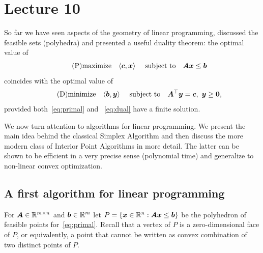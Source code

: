%
%
% 


\chapter*{Lecture 10}
\addtocounter{chapter}{10}
\addtocounter{section}{0}


So far we have seen aspects of the geometry of linear programming, discussed the feasible sets (polyhedra) and presented a useful duality theorem:
the optimal value of
\begin{equation}\label{eq:primal}\tag{P}
 \text{maximize}\quad \langle {\bm{c}}, {\bm{x}} \rangle \ \quad\text{subject to}\quad \bm{A}\bm{x}\leq \bm{b}
\end{equation}
coincides with the optimal value of
\begin{equation}\label{eq:dual}\tag{D}
 \text{minimize}\quad \langle {\bm{b}}, {\bm{y}} \rangle \ \quad\text{subject to}\quad \bm{A}^{\top}\bm{y}=\bm{c}, \  \bm{y}\geq \bm{0},
\end{equation}
provided both~\eqref{eq:primal} and ~\eqref{eq:dual} have a finite solution. 

We now turn attention to algorithms for linear programming. We present the main idea behind the classical Simplex Algorithm and then discuss the more modern class of Interior Point Algorithms in more detail. The latter can be shown to be efficient in a very precise sense (polynomial time) and generalize to non-linear convex optimization.

\section{A first algorithm for linear programming}
For $\bm{A}\in \mathbb{R}^{m\times n}$ and $\bm{b}\in \mathbb{R}^m$ let $P=\{\bm{x}\in \mathbb{R}^n\mathrel{\mathop{:}} \bm{A}\bm{x}\leq \bm{b}\}$ be the polyhedron of feasible points for~\eqref{eq:primal}. Recall that a vertex of $P$ is a zero-dimensional face of $P$, or equivalently, a point that cannot be written as convex combination of two distinct points of $P$.

